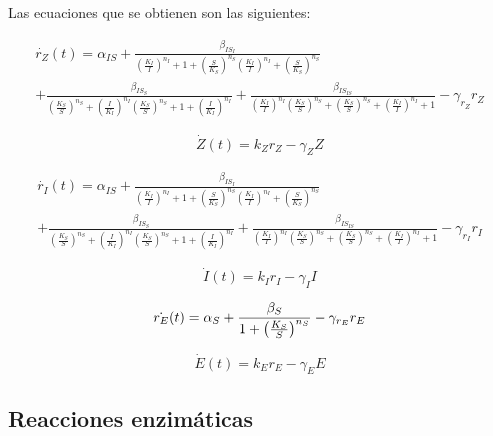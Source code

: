 \documentclass[12pt]{article}
\begin{document}
Las ecuaciones que se obtienen son las siguientes:

\begin{multline}
\label{eq:rZ}
\dot{r_Z}(t) = 
\alpha_{IS}
+ \frac{\beta_{IS_I}}{\left( \frac{K_I}{I} \right)^{n_I} + 1 + \left( \frac{S}{K_S} \right)^{n_S} \left( \frac{K_I}{I} \right)^{n_I} + \left( \frac{S}{K_S} \right)^{n_S}}\\
+ \frac{\beta_{IS_S}}{\left( \frac{K_S}{S} \right)^{n_S} + \left( \frac{I}{K_I} \right)^{n_I} \left( \frac{K_S}{S} \right)^{n_S} + 1 + \left( \frac{I}{K_I} \right)^{n_I}}
+ \frac{\beta_{IS_{IS}}}{\left( \frac{K_I}{I} \right)^{n_I} \left( \frac{K_S}{S} \right)^{n_S} + \left( \frac{K_S}{S} \right)^{n_S} + \left( \frac{K_I}{I} \right)^{n_I} + 1}
- \gamma_{r_Z} r_Z
\end{multline}

\begin{equation}
\label{eq:Z}
\dot{Z}(t) = k_Z r_Z - \gamma_Z Z
\end{equation}

\begin{multline}
\label{eq:rI}
\dot{r_I}(t) = 
\alpha_{IS}
+ \frac{\beta_{IS_I}}{\left( \frac{K_I}{I} \right)^{n_I} + 1 + \left( \frac{S}{K_S} \right)^{n_S} \left( \frac{K_I}{I} \right)^{n_I} + \left( \frac{S}{K_S} \right)^{n_S}}\\
+ \frac{\beta_{IS_S}}{\left( \frac{K_S}{S} \right)^{n_S} + \left( \frac{I}{K_I} \right)^{n_I} \left( \frac{K_S}{S} \right)^{n_S} + 1 + \left( \frac{I}{K_I} \right)^{n_I}}
+ \frac{\beta_{IS_{IS}}}{\left( \frac{K_I}{I} \right)^{n_I} \left( \frac{K_S}{S} \right)^{n_S} + \left( \frac{K_S}{S} \right)^{n_S} + \left( \frac{K_I}{I} \right)^{n_I} + 1}
- \gamma_{r_I} r_I
\end{multline}

\begin{equation}
\label{eq:I}
\dot{I}(t) = k_I r_I - \gamma_I I
\end{equation}

\begin{equation}
\label{eq:r_E}
\dot{r_E}(t) = \alpha_S + \frac{\beta_S}{1+ \left( \frac{K_S}{S}\right)^{n_S}} - \gamma_{r_E} r_E\\
\end{equation}

\begin{equation}
\label{eq:E}
\dot{E}(t) = k_E r_E - \gamma_EE
\end{equation}

\subsection{Reacciones enzim\'aticas}
\end{document}
